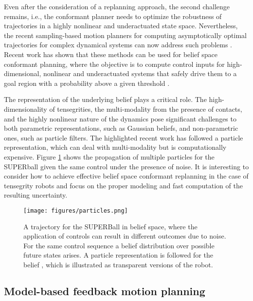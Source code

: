 Even after the consideration of a replanning approach, the second
challenge remains, i.e., the conformant planner needs to optimize the
robustness of trajectories in a highly nonlinear and underactuated
state space. Nevertheless, the recent sampling-based motion planners
for computing asymptotically optimal trajectories for complex
dynamical systems can now address such problems
\cite{Li2015Sparse-Methods-}. Recent work has shown that these methods
can be used for belief space conformant planning, where the objective
is to compute control inputs for high-dimensional, nonlinear and
underactuated systems that safely drive them to a goal region with a
probability above a given threshold \cite{Littlefield:2015aa}.

The representation of the underlying belief plays a critical role. The
high-dimensionality of tensegrities, the multi-modality from the
presence of contacts, and the highly nonlinear nature of the dynamics
pose significant challenges to both parametric representations, such
as Gaussian beliefs, and non-parametric ones, such as particle
filters. The highlighted recent work has followed a particle
representation, which can deal with multi-modality but is
computationally expensive. Figure \ref{fig:particles} shows the
propagation of multiple particles for the SUPERball given the same
control under the presence of noise.  It is interesting to consider
how to achieve effective belief space conformant replanning in the
case of tensegrity robots and focus on the proper modeling and fast
computation of the resulting uncertainty.

\begin{figure}[t]
\centering
\texttt{[image: figures/particles.png]}
\vspace{-0.3in}
\caption{A trajectory for the SUPERBall in belief space, where the
  application of controls can result in different outcomes due to noise.
  For the same control sequence a belief distribution over possible
  future states arises. A particle representation is followed for the
  belief \cite{Littlefield:2015aa}, which is illustrated as
  transparent versions of the robot.}  \vspace{-0.25in}
\label{fig:particles}
\end{figure}

\subsection {Model-based feedback motion planning}

